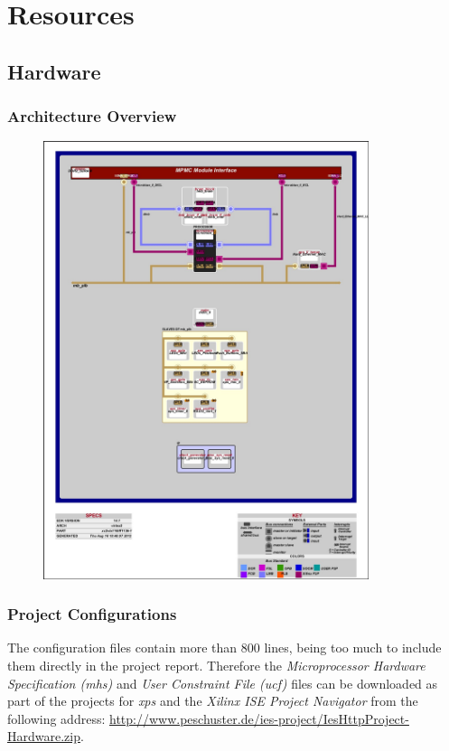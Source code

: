 \chapter{Resources}

\section{Hardware}

\subsection{Architecture Overview}
\label{sec:hw_arch}

\begin{figure}[H]
\centering
\includegraphics[width=0.85\textwidth]{images/system_blkd.jpg}
\end{figure}

\subsection{Project Configurations}

The configuration files contain more than 800 lines, being too much to include them directly in the project report. Therefore the \textit{Microprocessor Hardware Specification (mhs)} and \textit{User Constraint File (ucf)} files can be downloaded as part of the projects for \textit{\gls{xps}} and the \textit{Xilinx ISE Project Navigator} from the following address: \url{http://www.peschuster.de/ies-project/IesHttpProject-Hardware.zip}.
\\

